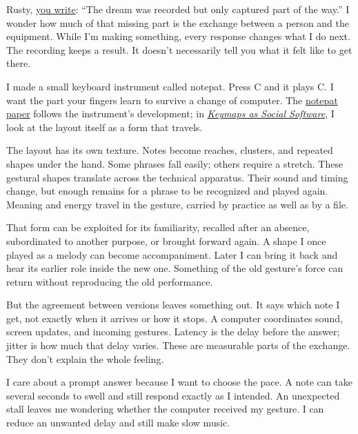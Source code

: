 \documentclass[12pt,letterpaper]{article}
\begin{document}
\noindent
Rusty, \href{https://rustysantos.substack.com/p/exploring-the-shadows-of-electronic}{you write}: “The dream was recorded but only captured part of the way.” I wonder how much of that missing part is the exchange between a person and the equipment. While I'm making something, every response changes what I do next. The recording keeps a result. It doesn't necessarily tell you what it felt like to get there.

I made a small keyboard instrument called notepat. Press C and it plays C. I want the part your fingers learn to survive a change of computer. The \href{https://papers.aesthetic.computer/notepat-26-arxiv.pdf}{notepat paper} follows the instrument's development; in \href{https://papers.aesthetic.computer/keymaps-social-software-26-arxiv.pdf}{\textit{Keymaps as Social Software}}, I look at the layout itself as a form that travels.

The layout has its own texture. Notes become reaches, clusters, and repeated shapes under the hand. Some phrases fall easily; others require a stretch. These gestural shapes translate across the technical apparatus. Their sound and timing change, but enough remains for a phrase to be recognized and played again. Meaning and energy travel in the gesture, carried by practice as well as by a file.

That form can be exploited for its familiarity, recalled after an absence, subordinated to another purpose, or brought forward again. A shape I once played as a melody can become accompaniment. Later I can bring it back and hear its earlier role inside the new one. Something of the old gesture's force can return without reproducing the old performance.

But the agreement between versions leaves something out. It says which note I get, not exactly when it arrives or how it stops. A computer coordinates sound, screen updates, and incoming gestures. Latency is the delay before the answer; jitter is how much that delay varies. These are measurable parts of the exchange. They don't explain the whole feeling.

I care about a prompt answer because I want to choose the pace. A note can take several seconds to swell and still respond exactly as I intended. An unexpected stall leaves me wondering whether the computer received my gesture. I can reduce an unwanted delay and still make slow music.
\end{document}
